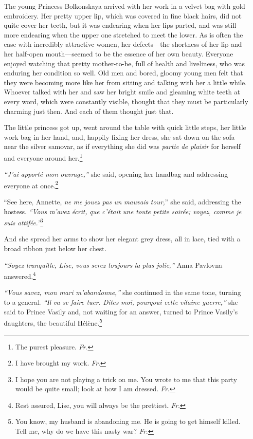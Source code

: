 The young Princess Bolkonskaya arrived with her work in a velvet bag
with gold embroidery. Her pretty upper lip, which was covered in fine
black hairs, did not quite cover her teeth, but it was endearing when
her lips parted, and was still more endearing when the upper one
stretched to meet the lower. As is often the case with incredibly
attractive women, her defects---the shortness of her lip and her
half-open mouth---seemed to be the essence of her own beauty. Everyone
enjoyed watching that pretty mother-to-be, full of health and
liveliness, who was enduring her condition so well. Old men and bored,
gloomy young men felt that they were becoming more like her from
sitting and talking with her a little while. Whoever talked with her
and saw her bright smile and gleaming white teeth at every word, which
were constantly visible, thought that they must be particularly charming
just then. And each of them thought just that.

The little princess got up, went around the table with quick little
steps, her little work bag in her hand, and, happily fixing her dress,
she sat down on the sofa near the silver samovar, as if everything she
did was \textit{partie de plaisir} for herself and everyone around
her.\footnote{The purest pleasure. \textit{Fr.}} 

\textit{``J'ai apport\'e mon ouvrage,''} she said, opening her handbag
and addressing everyone at once.\footnote{I have brought my
  work. \textit{Fr.}} %

``See here, Annette, \textit{ne me jouez pas un mauvais tour,}'' she
said, addressing the hostess. \textit{``Vous m'avez \'ecrit, que
  c'\'etait une toute petite soir\'ee; voyez, comme je suis
  attif\'ee.''}\footnote{I hope you are not playing a trick on me. You
  wrote to me that this party would be quite small; look at how I am
  dressed. \textit{Fr.}} %

And she spread her arms to show her elegant grey dress, all in lace,
tied with a broad ribbon just below her chest.

\textit{``Soyez tranquille, Lise, vous serez toujours la plus
  jolie,''} Anna Pavlovna answered.\footnote{Rest assured, Lise, you
  will always be the prettiest. \textit{Fr.}} %

\textit{``Vous savez, mon mari m'abandonne,''} she continued in the
same tone, turning to a general. \textit{``Il va se faire tuer. Dites
  moi, pourqoui cette vilaine guerre,''} she said to Prince Vasily
and, not waiting for an answer, turned to Prince Vasily's daughters,
the beautiful H\'el\`ene.\footnote{You know, my husband is abandoning
  me. He is going to get himself killed. Tell me, why do we have this
  nasty war? \textit{Fr.}} %

